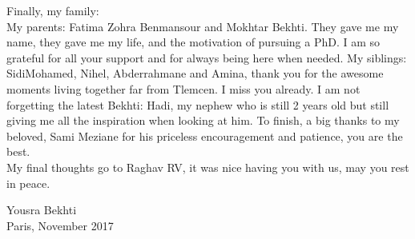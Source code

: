 \begin{acknowledgements}
Finally, my family: \\
My parents: Fatima Zohra Benmansour and Mokhtar Bekhti. They gave me my name, they gave me my life, and the motivation of pursuing a PhD. I am so grateful for all your support and for always being here when needed. My siblings: SidiMohamed, Nihel, Abderrahmane and Amina, thank you for the awesome moments living together far from Tlemcen. I miss you already. I am not forgetting the latest Bekhti: Hadi, my nephew who is still 2 years old but still giving me all the inspiration when looking at him. To finish, a big thanks to my beloved, Sami Meziane for his priceless encouragement and patience, you are the best.\\

My final thoughts go to Raghav RV, it was nice having you with us, may you rest in peace.

{\raggedleft Yousra Bekhti\\}%
{\raggedleft Paris, November 2017\\}
\end{acknowledgements}
\leavevmode\thispagestyle{empty}\newpage